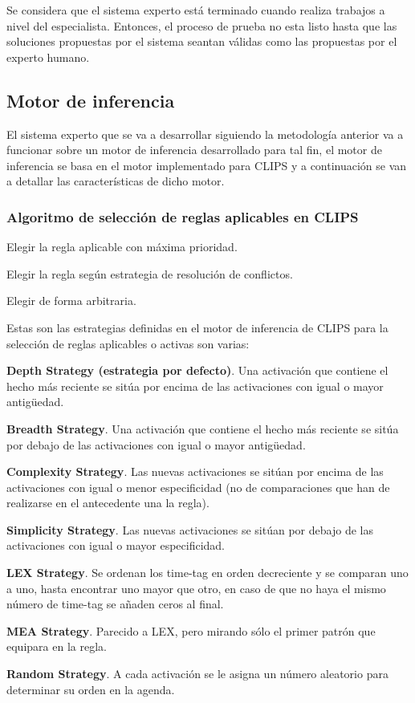 Se considera que el sistema experto está terminado cuando realiza trabajos a nivel
 del especialista. Entonces, el proceso de prueba no esta listo hasta que las soluciones
 propuestas por el sistema seantan válidas como las propuestas por el experto humano.

\subsection{Motor de inferencia}
El sistema experto que se va a desarrollar siguiendo la metodología anterior va
 a funcionar sobre un motor de inferencia desarrollado para tal fin, el motor
 de inferencia se basa en el motor implementado para CLIPS y a continuación se van
 a detallar las características de dicho motor.

\subsubsection{Algoritmo de selección de reglas aplicables en CLIPS}
\begin{compactitem}
  \item Elegir la regla aplicable con máxima prioridad.
  \item Elegir la regla según estrategia de resolución de conflictos.
  \item Elegir de forma arbitraria.
\end{compactitem}

Estas son las estrategias definidas en el motor de inferencia de CLIPS para
 la selección de reglas aplicables o activas son varias:

\begin{compactitem}
  \item \textbf{Depth Strategy (estrategia por defecto)}. Una activación que contiene el hecho
    más reciente se sitúa por encima de las activaciones con igual o mayor antigüedad.
 \item \textbf{Breadth Strategy}. Una activación que contiene el hecho más reciente se
    sitúa por debajo de las activaciones con igual o mayor antigüedad.
 \item \textbf{Complexity Strategy}. Las nuevas activaciones se sitúan por encima de las
    activaciones con igual o menor especificidad (no de comparaciones que han de
    realizarse en el antecedente una la regla).
 \item \textbf{Simplicity Strategy}. Las nuevas activaciones se sitúan por debajo de las
    activaciones con igual o mayor especificidad.
 \item \textbf{LEX Strategy}. Se ordenan los time-tag en orden decreciente y se comparan
    uno a uno, hasta encontrar uno mayor que otro, en caso de que no haya el mismo
    número de time-tag se añaden ceros al final.
 \item \textbf{MEA Strategy}. Parecido a LEX, pero mirando sólo el primer patrón que
    equipara en la regla.
 \item \textbf{Random Strategy}. A cada activación se le asigna un número aleatorio para
    determinar su orden en la agenda.
\end{compactitem}

